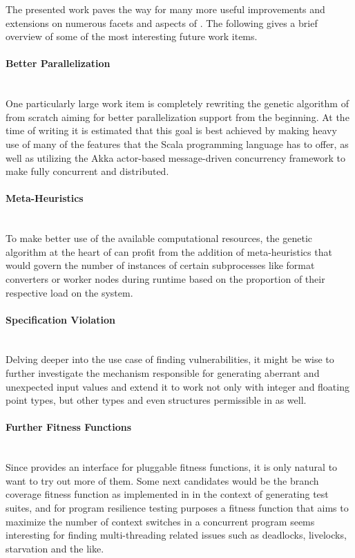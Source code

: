 The presented work paves the way for many more useful improvements and extensions on numerous facets and
aspects of \xmlmate. The following gives a brief overview of some of the most interesting future work items.

\paragraph{Better Parallelization} ~\\
One particularly large work item is completely rewriting the
genetic algorithm of \xmlmate from scratch aiming for better parallelization support from the beginning. At the time of writing it is estimated that this
goal is best achieved by making heavy use of many of the features that the
Scala\cite{scala-overview-tech-report} programming language has to offer, as well as utilizing the Akka actor-based message-driven concurrency framework\cite{Wyatt:2013:AC:2663429} to make \xmlmate fully
concurrent and distributed.
\paragraph{Meta-Heuristics} ~\\
To make better use of the available computational resources, the genetic algorithm at the heart of
\xmlmate can profit from the addition of meta-heuristics that would govern the number of instances of certain
subprocesses like format converters or worker nodes during runtime based on the proportion of their
respective load on the system.
\paragraph{Specification Violation} ~\\
Delving deeper into the use case of finding vulnerabilities, it might be wise to further investigate
the mechanism responsible for generating aberrant and unexpected input values and extend it to work not only
with integer and floating point types, but other types and even structures permissible in \xml as well.
\paragraph{Further Fitness Functions} ~\\
Since \xmlmate provides an interface for pluggable fitness functions, it is only natural to want to try
out more of them. Some next candidates would be the branch coverage fitness function as implemented in
\evosuite in the context of generating test suites, and for program resilience testing purposes a fitness
function that aims to maximize the number of context switches in a concurrent program seems interesting for
finding multi-threading related issues such as deadlocks, livelocks, starvation and the like.
